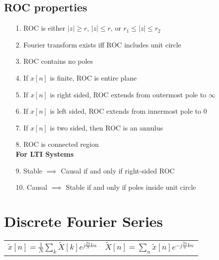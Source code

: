 \documentclass{article}
\begin{document}
\subsection*{ROC properties}
\begin{itemize}
    \item[1.] ROC is either $|z|\ge r$, $|z|\le r$, or $r_1 \le |z| \le r_2$
    \item[2.] Fourier transform exists iff ROC includes unit circle
    \item[3.] ROC contains no poles
    \item[4.] If $x[n]$ is finite, ROC is entire plane
    \item[5.] If $x[n]$ is right sided, ROC extends from outermost pole to $\infty$
    \item[6.] If $x[n]$ is left sided, ROC extends from innermost pole to 0
    \item[7.] If $x[n]$ is two sided, then ROC is an annulus
    \item[8.] ROC is connected region\\
    \textbf{For LTI Systems}
    \item[9.] Stable $\implies$ Causal if and only if right-sided ROC
    \item[10.] Causal $\implies$ Stable if and only if poles inside unit circle
\end{itemize}
\pagebreak
\section*{Discrete Fourier Series}
\begin{center}
    \begin{tabularx}{\textwidth - 1in}{XX}
        $\tilde{x}[n] = \frac{1}{N}\sum_k\tilde{X}[k]e^{j\frac{2\pi}{N}kn}$ & $\tilde{X}[n] = \sum_{n}{\tilde{x}[n]e^{-j\frac{2\pi}{n}kn}}$
    \end{tabularx}
\end{center}
\end{document}
